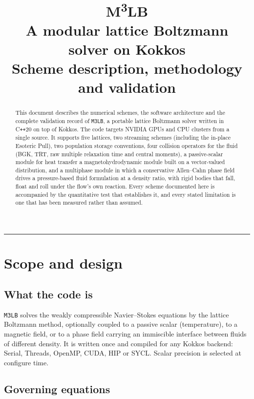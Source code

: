 \documentclass[11pt,a4paper]{article}
\title{\vspace{-1.4cm}\textbf{M\textsuperscript{3}LB}\\[2mm]
\large A modular lattice Boltzmann solver on Kokkos\\[1mm]
\normalsize Scheme description, methodology and validation}
\author{}
\date{}
\newcommand{\code}[1]{\texttt{\small #1}}
\begin{document}
\maketitle
\vspace{-1.2cm}

\begin{abstract}
\noindent
This document describes the numerical schemes, the software architecture and the
complete validation record of \code{M3LB}, a portable lattice Boltzmann
solver written in C\texttt{++}20 on top of Kokkos. The code targets NVIDIA GPUs
and CPU clusters from a single source. It supports five lattices, two streaming
schemes (including the in-place Esoteric Pull), two population storage
conventions, four collision operators for the fluid (BGK, TRT, raw multiple
relaxation time and central moments), a passive-scalar module for heat transfer
a magnetohydrodynamic module built on a vector-valued distribution, and a
multiphase module in which a conservative Allen--Cahn phase field drives a
pressure-based fluid formulation at a density ratio, with rigid bodies that fall,
float and roll under the flow's own reaction. Every scheme documented here is
accompanied by the quantitative test that establishes it, and every stated
limitation is one that has been measured rather than assumed.
\end{abstract}

\tableofcontents
\bigskip
\hrule

\section{Scope and design}

\subsection{What the code is}

\code{M3LB} solves the weakly compressible Navier--Stokes equations by the
lattice Boltzmann method, optionally coupled to a passive scalar (temperature),
to a magnetic field, or to a phase field carrying an immiscible interface between
fluids of different density. It is written once and compiled for any Kokkos backend:
Serial, Threads, OpenMP, CUDA, HIP or SYCL. Scalar precision is selected at
configure time.

\subsection{Governing equations}
\end{document}

